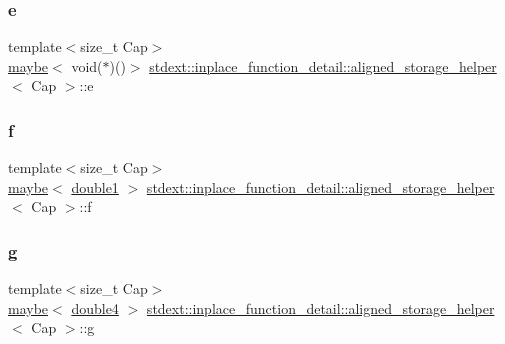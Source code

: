 \subsubsection{\texorpdfstring{e}{e}}
{\footnotesize\ttfamily template$<$size\+\_\+t Cap$>$ \\
\hyperlink{unionstdext_1_1inplace__function__detail_1_1aligned__storage__helper_a8265d2d65d57b5e7de088f8b6fc02370}{maybe}$<$ void($\ast$)()$>$ \hyperlink{unionstdext_1_1inplace__function__detail_1_1aligned__storage__helper}{stdext\+::inplace\+\_\+function\+\_\+detail\+::aligned\+\_\+storage\+\_\+helper}$<$ Cap $>$\+::e}

\mbox{\label{unionstdext_1_1inplace__function__detail_1_1aligned__storage__helper_a3d89d23804162fcae83e24dcaf6a5acd}} 
\subsubsection{\texorpdfstring{f}{f}}
{\footnotesize\ttfamily template$<$size\+\_\+t Cap$>$ \\
\hyperlink{unionstdext_1_1inplace__function__detail_1_1aligned__storage__helper_a8265d2d65d57b5e7de088f8b6fc02370}{maybe}$<$ \hyperlink{structstdext_1_1inplace__function__detail_1_1aligned__storage__helper_1_1double1}{double1} $>$ \hyperlink{unionstdext_1_1inplace__function__detail_1_1aligned__storage__helper}{stdext\+::inplace\+\_\+function\+\_\+detail\+::aligned\+\_\+storage\+\_\+helper}$<$ Cap $>$\+::f}

\mbox{\label{unionstdext_1_1inplace__function__detail_1_1aligned__storage__helper_a3ec253d4296818e85bb04c048b321bf8}} 
\subsubsection{\texorpdfstring{g}{g}}
{\footnotesize\ttfamily template$<$size\+\_\+t Cap$>$ \\
\hyperlink{unionstdext_1_1inplace__function__detail_1_1aligned__storage__helper_a8265d2d65d57b5e7de088f8b6fc02370}{maybe}$<$ \hyperlink{structstdext_1_1inplace__function__detail_1_1aligned__storage__helper_1_1double4}{double4} $>$ \hyperlink{unionstdext_1_1inplace__function__detail_1_1aligned__storage__helper}{stdext\+::inplace\+\_\+function\+\_\+detail\+::aligned\+\_\+storage\+\_\+helper}$<$ Cap $>$\+::g}

